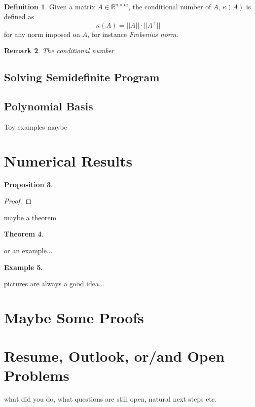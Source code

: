 \documentclass[12pt]{amsart}
\numberwithin{equation}{section}
\newtheorem{thm}{Theorem}
\newtheorem{prop}[thm]{Proposition}
\newtheorem{remark}[thm]{Remark}
\theoremstyle{definition}
\newtheorem{definition}[thm]{Definition}
\newtheorem{example}[thm]{Example}
\numberwithin{thm}{section}
\begin{document}
\begin{definition}
     Given a matrix $A \in \mathbb{R}^{n \times m}$, the conditional number of $A$, $\kappa(A)$ is defined as
     \begin{equation}
          \kappa(A) = ||A|| \cdot ||A^+||
     \end{equation}
     for any norm imposed on $A$, for instance \emph{Frobenius norm}.
\end{definition}

\begin{remark}
     The conditional number 
\end{remark}

\subsection{Solving Semidefinite Program}
\label{Sec:Solving Semidefinite Program}


\subsection{Polynomial Basis}
\label{Sec:polynomial Basis}

Toy examples maybe

\section{Numerical Results}


\begin{prop}

\end{prop}

\begin{proof}

\end{proof}

maybe a theorem


\begin{thm}

\end{thm}

or an example...
\begin{example}

\end{example}

pictures are always a good idea...



\section{Maybe Some Proofs}


\section{Resume, Outlook, or/and Open Problems}
\label{Sec:Outlook}


what did you do, what questions are still open, natural next steps etc. 





\end{document}
